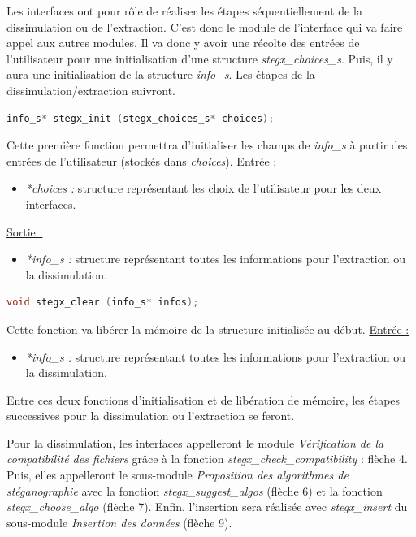 \documentclass[11pt]{article}
\begin{document}
Les interfaces ont pour rôle de réaliser les étapes séquentiellement 
de la dissimulation ou de l'extraction. C'est donc le module de l’interface qui 
va faire appel aux autres modules. 
Il va donc y avoir une récolte des entrées de l'utilisateur pour une 
initialisation d'une structure \textit{stegx\_choices\_s}. 
Puis, il y aura une initialisation de la structure \textit{info\_s}. 
Les étapes de la dissimulation/extraction suivront. \newline

\begin{lstlisting}[language=c]
info_s* stegx_init (stegx_choices_s* choices);
\end{lstlisting}

Cette première fonction permettra d'initialiser les champs de \textit{info\_s} 
à partir des entrées de l'utilisateur (stockés dans \textit{choices}). 
\newline
\underline{Entrée :} 
\begin{itemize}
\item \textit{*choices :} structure représentant les choix de 
l'utilisateur pour les deux interfaces. 
\end{itemize}
\underline{Sortie :} 
\begin{itemize}
\item \textit{*info\_s :} structure représentant toutes les informations 
pour l'extraction ou la dissimulation.   
\newline 
\end{itemize}

\begin{lstlisting}[language=c]
void stegx_clear (info_s* infos);
\end{lstlisting}

Cette fonction va libérer la mémoire de la structure initialisée au début. 
\newline
\underline{Entrée :} 
\begin{itemize}
\item \textit{*info\_s :} structure représentant toutes les informations 
pour l'extraction ou la dissimulation. 
\end{itemize} 

Entre ces deux fonctions d'initialisation et de libération de mémoire, 
les étapes successives pour la dissimulation ou l'extraction se feront. 

Pour la dissimulation, les interfaces appelleront le module 
\textit{Vérification de la compatibilité des fichiers} grâce à la fonction 
\textit{stegx\_check\_compatibility} : flèche 4. 
Puis, elles appelleront le sous-module 
\textit{Proposition des algorithmes de stéganographie} avec la fonction 
\textit{stegx\_suggest\_algos} (flèche 6) et la fonction 
\textit{stegx\_choose\_algo} (flèche 7). 
Enfin, l'insertion sera réalisée avec \textit{stegx\_insert} du sous-module 
\textit{Insertion des données} (flèche 9). 
\end{document}
